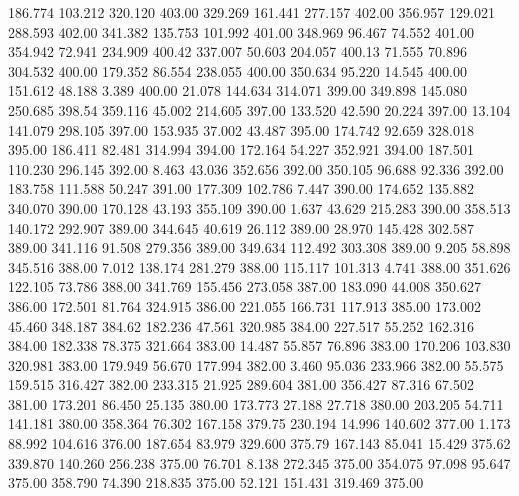  186.774  103.212  320.120       403.00
 329.269  161.441  277.157       402.00
 356.957  129.021  288.593       402.00
 341.382  135.753  101.992       401.00
 348.969   96.467   74.552       401.00
 354.942   72.941  234.909       400.42
 337.007   50.603  204.057       400.13
  71.555   70.896  304.532       400.00
 179.352   86.554  238.055       400.00
 350.634   95.220   14.545       400.00
 151.612   48.188    3.389       400.00
  21.078  144.634  314.071       399.00
 349.898  145.080  250.685       398.54
 359.116   45.002  214.605       397.00
 133.520   42.590   20.224       397.00
  13.104  141.079  298.105       397.00
 153.935   37.002   43.487       395.00
 174.742   92.659  328.018       395.00
 186.411   82.481  314.994       394.00
 172.164   54.227  352.921       394.00
 187.501  110.230  296.145       392.00
   8.463   43.036  352.656       392.00
 350.105   96.688   92.336       392.00
 183.758  111.588   50.247       391.00
 177.309  102.786    7.447       390.00
 174.652  135.882  340.070       390.00
 170.128   43.193  355.109       390.00
   1.637   43.629  215.283       390.00
 358.513  140.172  292.907       389.00
 344.645   40.619   26.112       389.00
  28.970  145.428  302.587       389.00
 341.116   91.508  279.356       389.00
 349.634  112.492  303.308       389.00
   9.205   58.898  345.516       388.00
   7.012  138.174  281.279       388.00
 115.117  101.313    4.741       388.00
 351.626  122.105   73.786       388.00
 341.769  155.456  273.058       387.00
 183.090   44.008  350.627       386.00
 172.501   81.764  324.915       386.00
 221.055  166.731  117.913       385.00
 173.002   45.460  348.187       384.62
 182.236   47.561  320.985       384.00
 227.517   55.252  162.316       384.00
 182.338   78.375  321.664       383.00
  14.487   55.857   76.896       383.00
 170.206  103.830  320.981       383.00
 179.949   56.670  177.994       382.00
   3.460   95.036  233.966       382.00
  55.575  159.515  316.427       382.00
 233.315   21.925  289.604       381.00
 356.427   87.316   67.502       381.00
 173.201   86.450   25.135       380.00
 173.773   27.188   27.718       380.00
 203.205   54.711  141.181       380.00
 358.364   76.302  167.158       379.75
 230.194   14.996  140.602       377.00
   1.173   88.992  104.616       376.00
 187.654   83.979  329.600       375.79
 167.143   85.041   15.429       375.62
 339.870  140.260  256.238       375.00
  76.701    8.138  272.345       375.00
 354.075   97.098   95.647       375.00
 358.790   74.390  218.835       375.00
  52.121  151.431  319.469       375.00
